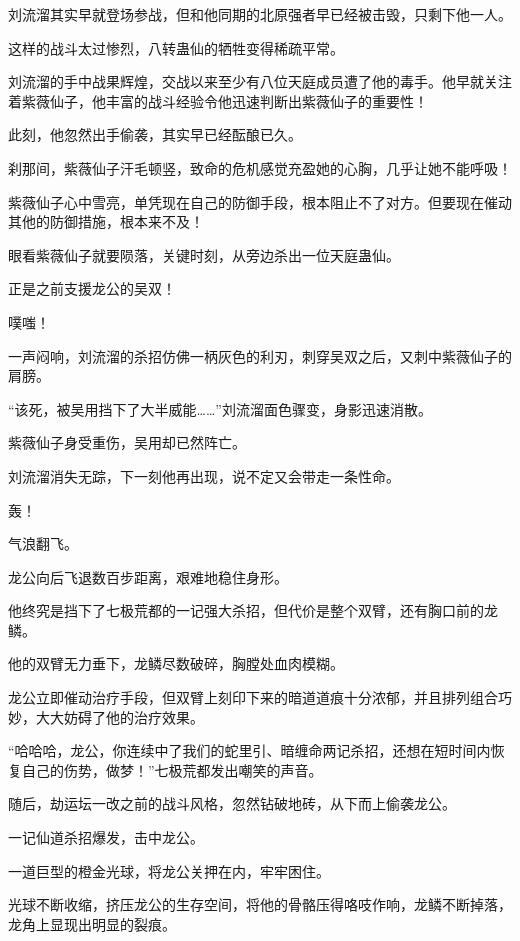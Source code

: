 
\begin{this_body}

刘流溜其实早就登场参战，但和他同期的北原强者早已经被击毁，只剩下他一人。

这样的战斗太过惨烈，八转蛊仙的牺牲变得稀疏平常。

刘流溜的手中战果辉煌，交战以来至少有八位天庭成员遭了他的毒手。他早就关注着紫薇仙子，他丰富的战斗经验令他迅速判断出紫薇仙子的重要性！

此刻，他忽然出手偷袭，其实早已经酝酿已久。

刹那间，紫薇仙子汗毛顿竖，致命的危机感觉充盈她的心胸，几乎让她不能呼吸！

紫薇仙子心中雪亮，单凭现在自己的防御手段，根本阻止不了对方。但要现在催动其他的防御措施，根本来不及！

眼看紫薇仙子就要陨落，关键时刻，从旁边杀出一位天庭蛊仙。

正是之前支援龙公的吴双！

噗嗤！

一声闷响，刘流溜的杀招仿佛一柄灰色的利刃，刺穿吴双之后，又刺中紫薇仙子的肩膀。

“该死，被吴用挡下了大半威能……”刘流溜面色骤变，身影迅速消散。

紫薇仙子身受重伤，吴用却已然阵亡。

刘流溜消失无踪，下一刻他再出现，说不定又会带走一条性命。

轰！

气浪翻飞。

龙公向后飞退数百步距离，艰难地稳住身形。

他终究是挡下了七极荒都的一记强大杀招，但代价是整个双臂，还有胸口前的龙鳞。

他的双臂无力垂下，龙鳞尽数破碎，胸膛处血肉模糊。

龙公立即催动治疗手段，但双臂上刻印下来的暗道道痕十分浓郁，并且排列组合巧妙，大大妨碍了他的治疗效果。

“哈哈哈，龙公，你连续中了我们的蛇里引、暗缠命两记杀招，还想在短时间内恢复自己的伤势，做梦！”七极荒都发出嘲笑的声音。

随后，劫运坛一改之前的战斗风格，忽然钻破地砖，从下而上偷袭龙公。

一记仙道杀招爆发，击中龙公。

一道巨型的橙金光球，将龙公关押在内，牢牢困住。

光球不断收缩，挤压龙公的生存空间，将他的骨骼压得咯吱作响，龙鳞不断掉落，龙角上显现出明显的裂痕。


\end{this_body}
